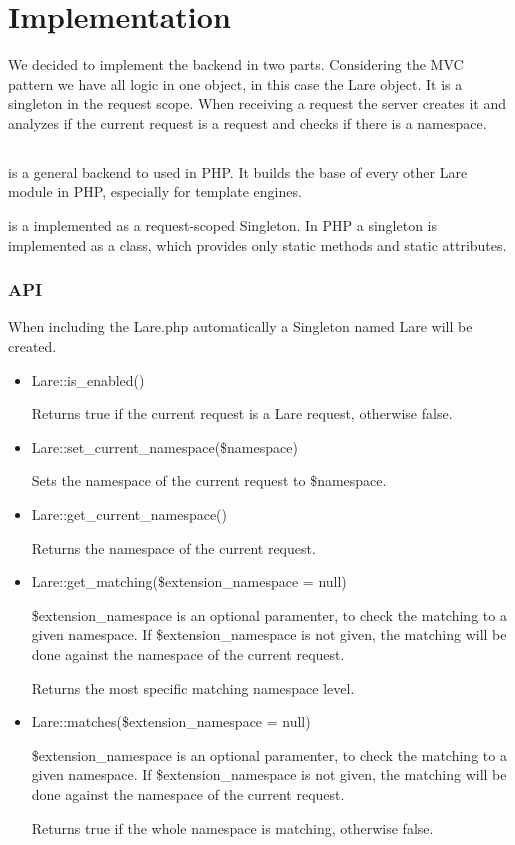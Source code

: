 \section{Implementation}

We decided to implement the \lare{} backend in two parts.
Considering the MVC pattern we have all logic in one object, in this case the Lare object.
It is a singleton in the request scope.
When receiving a request the server creates it and analyzes if the current request is a \lare{} request and checks if there is a namespace.


\subsection{\phpLare{}}
\phpLare{} is a general \lare{} backend to used in PHP.
It builds the base of every other Lare module in PHP, especially for template engines.

\lare{} is a implemented as a request-scoped Singleton.
In PHP a singleton is implemented as a class, which provides only static methods and static attributes.

\subsubsection{API}

When including the Lare.php automatically a Singleton named Lare will be created.
\begin{itemize}
\item Lare::is\_enabled()

Returns true if the current request is a Lare request, otherwise false.
\item Lare::set\_current\_namespace(\$namespace)

Sets the namespace of the current request to \$namespace.
\item Lare::get\_current\_namespace()

Returns the namespace of the current request.
\item Lare::get\_matching(\$extension\_namespace = null)

\$extension\_namespace is an optional paramenter, to check the matching to a given namespace. If \$extension\_namespace is not given, the matching will be done against the namespace of the current request.

Returns the most specific matching namespace level.
\item Lare::matches(\$extension\_namespace = null)

\$extension\_namespace is an optional paramenter, to check the matching to a given namespace. If \$extension\_namespace is not given, the matching will be done against the namespace of the current request.

Returns true if the whole namespace is matching, otherwise false.
\end{itemize}
    
